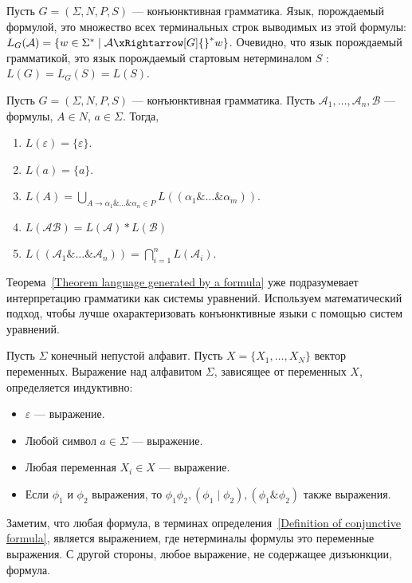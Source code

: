 \begin{definition}
    Пусть $G = (\Sigma,N,P,S)$ --- конъюнктивная грамматика. Язык, порождаемый формулой, это множество всех терминальных строк выводимых из этой формулы: $L_{G}(\mathcal{A}) = \{w\in\Sigma^* \mid \mathcal{A} \xRightarrow[G]{}^*w\}$. Очевидно, что язык порождаемый грамматикой, это язык порождаемый стартовым нетерминалом $S$ : $L(G) = L_{G}(S) = L(S)$.
\end{definition}

\begin{theorem}\label{Theorem language generated by a formula}
    Пусть $G = (\Sigma,N,P,S)$ --- конъюнктивная грамматика. Пусть $\mathcal{A}_1,\ldots,\mathcal{A}_n,\mathcal{B}$ --- формулы, $A \in N$, $a \in \Sigma$. Тогда,
    \begin{enumerate}
        \item $L(\varepsilon) = \{\varepsilon\}$.
        \item $L(a) = \{a\}$.
        \item $L(A) = \bigcup_{A \rightarrow \alpha_1\&\ldots\&\alpha_n \in P} L((\alpha_1\&\ldots\&\alpha_m))$.
        \item $L(\mathcal{AB}) = L(\mathcal{A})*L(\mathcal{B})$
        \item $L((\mathcal{A}_1\&\ldots\&\mathcal{A}_n)) = \bigcap_{i = 1}^{n}L(\mathcal{A}_i)$.
    \end{enumerate}
\end{theorem}

Теорема~\ref{Theorem language generated by a formula} уже подразумевает интерпретацию грамматики как системы уравнений. Используем математический подход, чтобы лучше охарактеризовать конъюнктивные языки с помощью систем уравнений.

\begin{definition}[Выражение]
    Пусть $\Sigma$ конечный непустой алфавит. Пусть $X = \{X_1,\ldots,X_N\}$ вектор переменных. Выражение над алфавитом $\Sigma$, зависящее от переменных $X$, определяется индуктивно:
    \begin{itemize}
       \item $\varepsilon$ --- выражение.
       \item Любой символ $a\in\Sigma$ --- выражение.
       \item Любая переменная $X_i\in X$ --- выражение.
       \item Если $\phi_1$ и $\phi_2$ выражения, то $\phi_1\phi_2, (\phi_1\mid\phi_2), (\phi_1\&\phi_2)$ также выражения.
    \end{itemize}
    Заметим, что любая формула, в терминах определения~\ref{Definition of conjunctive formula}, является выражением, где нетерминалы формулы это переменные выражения. С другой стороны, любое выражение, не содержащее дизъюнкции, формула.
\end{definition}

